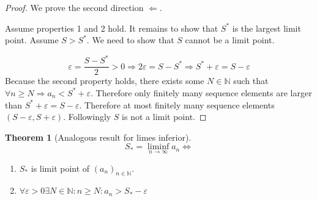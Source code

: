 \documentclass[a4paper,landscape,twocolumn]{article}
\theoremstyle{definition}
\newtheorem{theorem}{Theorem}
\newcommand\seq[1]{{\left(#1\right)}_{n \in \mathbb N}}
\begin{document}
\begin{proof}
  We prove the second direction $\Leftarrow$.

  Assume properties 1 and 2 hold. It remains to show that $S^*$ is the largest limit point.
  Assume $S > S^*$. We need to show that $S$ cannot be a limit point.

  \[
    \varepsilon = \frac{S - S^*}{2} > 0
    \Rightarrow 2\varepsilon = S - S^*
    \Rightarrow S^* + \varepsilon = S - \varepsilon
  \]
  Because the second property holds, there exists some $N \in \mathbb N$ such that
  $\forall n \geq N \Rightarrow a_n < S^* + \varepsilon$. Therefore only finitely many
  sequence elements are larger than $S^* + \varepsilon = S - \varepsilon$.
  Therefore at most finitely many sequence elements $(S - \varepsilon, S + \varepsilon)$.
  Followingly $S$ is not a limit point.
\end{proof}

\begin{theorem}[Analogous result for limes inferior]
  \[ S_* = \liminf_{n\to\infty} a_n \Leftrightarrow \]
  \begin{enumerate}
    \item $S_*$ is limit point of $\seq{a_n}$.
    \item $\forall \varepsilon > 0 \exists N \in \mathbb N: n \geq N: a_n > S_* - \varepsilon$
  \end{enumerate}
\end{theorem}
\end{document}
